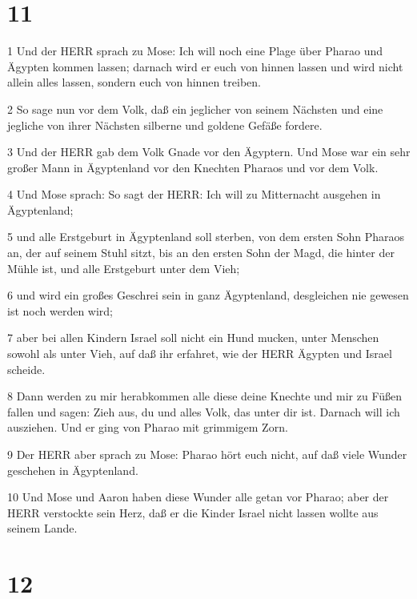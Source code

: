 \chapter{11}

\par 1 Und der HERR sprach zu Mose: Ich will noch eine Plage über Pharao und Ägypten kommen lassen; darnach wird er euch von hinnen lassen und wird nicht allein alles lassen, sondern euch von hinnen treiben.
\par 2 So sage nun vor dem Volk, daß ein jeglicher von seinem Nächsten und eine jegliche von ihrer Nächsten silberne und goldene Gefäße fordere.
\par 3 Und der HERR gab dem Volk Gnade vor den Ägyptern. Und Mose war ein sehr großer Mann in Ägyptenland vor den Knechten Pharaos und vor dem Volk.
\par 4 Und Mose sprach: So sagt der HERR: Ich will zu Mitternacht ausgehen in Ägyptenland;
\par 5 und alle Erstgeburt in Ägyptenland soll sterben, von dem ersten Sohn Pharaos an, der auf seinem Stuhl sitzt, bis an den ersten Sohn der Magd, die hinter der Mühle ist, und alle Erstgeburt unter dem Vieh;
\par 6 und wird ein großes Geschrei sein in ganz Ägyptenland, desgleichen nie gewesen ist noch werden wird;
\par 7 aber bei allen Kindern Israel soll nicht ein Hund mucken, unter Menschen sowohl als unter Vieh, auf daß ihr erfahret, wie der HERR Ägypten und Israel scheide.
\par 8 Dann werden zu mir herabkommen alle diese deine Knechte und mir zu Füßen fallen und sagen: Zieh aus, du und alles Volk, das unter dir ist. Darnach will ich ausziehen. Und er ging von Pharao mit grimmigem Zorn.
\par 9 Der HERR aber sprach zu Mose: Pharao hört euch nicht, auf daß viele Wunder geschehen in Ägyptenland.
\par 10 Und Mose und Aaron haben diese Wunder alle getan vor Pharao; aber der HERR verstockte sein Herz, daß er die Kinder Israel nicht lassen wollte aus seinem Lande.

\chapter{12}

